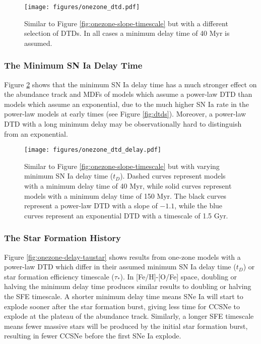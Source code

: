 \documentclass[twocolumn]{aastex631}
\begin{document}
\begin{figure}
    \centering
    \texttt{[image: figures/onezone\_dtd.pdf]}
    \caption{Similar to Figure \ref{fig:onezone-slope-timescale} but with a different selection of DTDs. In all cases a minimum delay time of 40 Myr is assumed.}
    \label{fig:onezone-dtd}
\end{figure}

\subsubsection{The Minimum SN Ia Delay Time}

Figure \ref{fig:onezone-dtd-delay} shows that the minimum SN Ia delay time has a much stronger effect on the abundance track and MDFs of models which assume a power-law DTD than models which assume an exponential, due to the much higher SN Ia rate in the power-law models at early times (see Figure \ref{fig:dtds}). Moreover, a power-law DTD with a long minimum delay may be observationally hard to distinguish from an exponential. 

\begin{figure}
    \centering
    \texttt{[image: figures/onezone\_dtd\_delay.pdf]}
    \caption{Similar to Figure \ref{fig:onezone-slope-timescale} but with varying minimum SN Ia delay time ($t_D$). Dashed curves represent models with a minimum delay time of 40 Myr, while solid curves represent models with a minimum delay time of 150 Myr. The black curves represent a power-law DTD with a slope of $-1.1$, while the blue curves represent an exponential DTD with a timescale of 1.5 Gyr.}
    \label{fig:onezone-dtd-delay}
\end{figure}

\subsubsection{The Star Formation History}

Figure \ref{fig:onezone-delay-taustar} shows results from one-zone models with a power-law DTD which differ in their assumed minimum SN Ia delay time ($t_D$) or star formation efficiency timescale ($\tau_*$). In [Fe/H]-[O/Fe] space, doubling or halving the minimum delay time produces similar results to doubling or halving the SFE timescale. A shorter minimum delay time means SNe Ia will start to explode sooner after the star formation burst, giving less time for CCSNe to explode at the plateau of the abundance track. Similarly, a longer SFE timescale means fewer massive stars will be produced by the initial star formation burst, resulting in fewer CCSNe before the first SNe Ia explode. 
\end{document}
